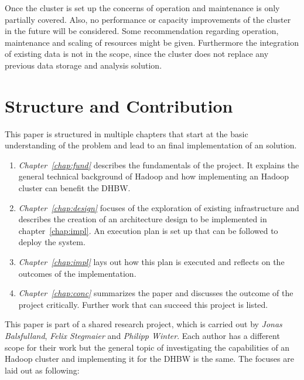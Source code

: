 Once the cluster is set up the concerns of operation and maintenance is only partially covered.
Also, no performance or capacity improvements of the cluster in the future will be considered.
Some recommendation regarding operation, maintenance and scaling of resources might be given.
Furthermore the integration of existing data is not 
in the scope, since the cluster does not replace any previous data storage and analysis solution.


\section{Structure and Contribution}
\label{sec:intro:structure}

This paper is structured in multiple chapters that start at the basic understanding of the problem 
and lead to an final implementation of an solution.

\begin{enumerate}
    \item \emph{Chapter~\ref{chap:fund}} describes the fundamentals of the project. 
        It explains the general technical background of Hadoop 
        and how implementing an Hadoop cluster can benefit the \ac{DHBW}. 
    \item \emph{Chapter~\ref{chap:design}} focuses of the exploration of existing
        infrastructure and describes the creation of an architecture design 
        to be implemented in chapter~\ref{chap:impl}. 
        An execution plan is set up that can be followed to deploy the system.
    \item \emph{Chapter~\ref{chap:impl}} lays out how this plan is executed 
        and reflects on the outcomes of the implementation. 
    \item \emph{Chapter~\ref{chap:conc}} summarizes the paper 
        and discusses the outcome of the project critically.
        Further work that can succeed this project is listed.
\end{enumerate}

This paper is part of a shared research project,
which is carried out by \emph{Jonas Balsfulland}, \emph{Felix Stegmaier} and \emph{Philipp Winter}.
Each author has a different scope for their work 
but the general topic of investigating the capabilities of an Hadoop cluster 
and implementing it for the \ac{DHBW} is the same.
The focuses are laid out as following:

